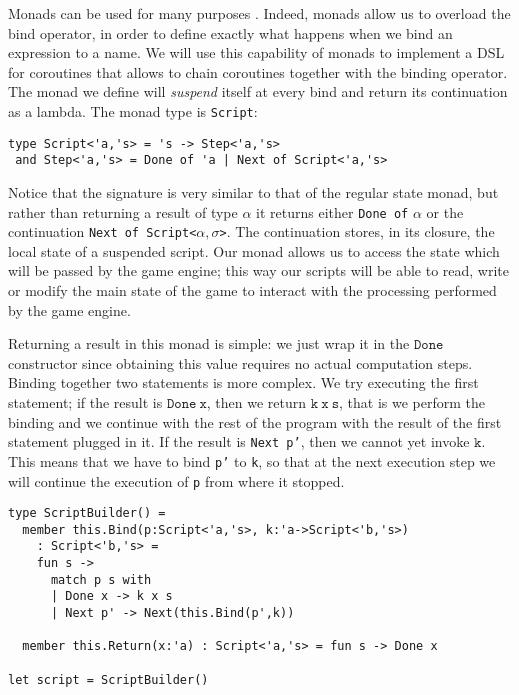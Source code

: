 
Monads can be used for many purposes \cite{MOGGI_MON,DECL_IMP,COMPR_MON,EFF_MON,CSHARP_ASYNC,CSHARP_LINQ}. Indeed, monads allow us to
overload the bind operator, in order to define exactly what happens
when we bind an expression to a name.  We will use this capability of monads to implement a DSL for coroutines that allows to chain coroutines together with the binding operator. The monad we define will \textit{suspend} itself at every bind and return its continuation as a lambda. The monad type is \texttt{Script}: 

\begin{lstlisting}
type Script<'a,'s> = 's -> Step<'a,'s>
 and Step<'a,'s> = Done of 'a | Next of Script<'a,'s>
\end{lstlisting}

Notice that the signature is very similar to that of the regular
state monad, but rather than returning a result of type $\alpha$
it returns either \texttt{Done\ of} $\alpha$ or the continuation 
\texttt{Next\ of\ Script<}$\alpha,\sigma$\texttt{>}. The continuation stores, in its closure, the local state of a suspended script. Our monad allows us to access the state which will be passed by the game engine; this way our scripts will be able to read, write or modify the main state of the game to interact with the processing performed by the game engine.

Returning a result in this monad is simple: we just wrap it in the
$\mathtt{Done}$ constructor since obtaining this value  requires no
actual computation steps. Binding together two statements is more complex. 
We try executing the first statement; if the result is
$\mathtt{Done\ x}$, then we return
$\mathtt{k\ x\ s}$, that is we perform the binding and we 
continue with the rest of the program with the result of the first
statement plugged in it. If the result is \texttt{Next\ p'}, then we cannot
yet invoke $\mathtt{k}$. This means
that we have to bind \texttt{p'} to \texttt{k}, so that at the next
execution step we will continue the execution of \texttt{p} from where
it stopped.

\begin{lstlisting}
type ScriptBuilder() = 
  member this.Bind(p:Script<'a,'s>, k:'a->Script<'b,'s>) 
    : Script<'b,'s> =
    fun s ->
      match p s with
      | Done x -> k x s
      | Next p' -> Next(this.Bind(p',k))

  member this.Return(x:'a) : Script<'a,'s> = fun s -> Done x

let script = ScriptBuilder()
\end{lstlisting}

